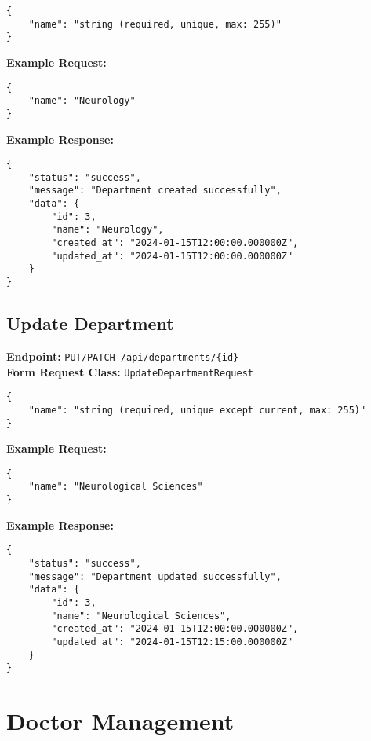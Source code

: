 \documentclass[12pt,a4paper]{article}
\begin{document}
\begin{lstlisting}[caption=Create Department Request Body]
{
    "name": "string (required, unique, max: 255)"
}
\end{lstlisting}

\textbf{Example Request:}
\begin{lstlisting}[caption=Create Department Example Request]
{
    "name": "Neurology"
}
\end{lstlisting}

\textbf{Example Response:}
\begin{lstlisting}[caption=Create Department Example Response]
{
    "status": "success",
    "message": "Department created successfully",
    "data": {
        "id": 3,
        "name": "Neurology",
        "created_at": "2024-01-15T12:00:00.000000Z",
        "updated_at": "2024-01-15T12:00:00.000000Z"
    }
}
\end{lstlisting}

\subsection{Update Department}
\textbf{Endpoint:} \texttt{PUT/PATCH /api/departments/\{id\}}\\
\textbf{Form Request Class:} \texttt{UpdateDepartmentRequest}

\begin{lstlisting}[caption=Update Department Request Body]
{
    "name": "string (required, unique except current, max: 255)"
}
\end{lstlisting}

\textbf{Example Request:}
\begin{lstlisting}[caption=Update Department Example Request]
{
    "name": "Neurological Sciences"
}
\end{lstlisting}

\textbf{Example Response:}
\begin{lstlisting}[caption=Update Department Example Response]
{
    "status": "success",
    "message": "Department updated successfully",
    "data": {
        "id": 3,
        "name": "Neurological Sciences",
        "created_at": "2024-01-15T12:00:00.000000Z",
        "updated_at": "2024-01-15T12:15:00.000000Z"
    }
}
\end{lstlisting}

\section{Doctor Management}
\end{document}
